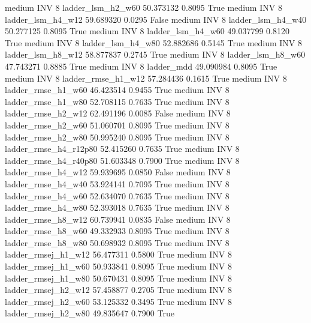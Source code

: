     medium      INV                 8      ladder_lsm_h2_w60  50.373132      0.8095    True
    medium      INV                 8      ladder_lsm_h4_w12  59.689320      0.0295   False
    medium      INV                 8      ladder_lsm_h4_w40  50.277125      0.8095    True
    medium      INV                 8      ladder_lsm_h4_w60  49.037799      0.8120    True
    medium      INV                 8      ladder_lsm_h4_w80  52.882686      0.5145    True
    medium      INV                 8      ladder_lsm_h8_w12  58.877837      0.2745    True
    medium      INV                 8      ladder_lsm_h8_w60  47.743271      0.8885    True
    medium      INV                 8             ladder_mdd  49.090984      0.8095    True
    medium      INV                 8     ladder_rmse_h1_w12  57.284436      0.1615    True
    medium      INV                 8     ladder_rmse_h1_w60  46.423514      0.9455    True
    medium      INV                 8     ladder_rmse_h1_w80  52.708115      0.7635    True
    medium      INV                 8     ladder_rmse_h2_w12  62.491196      0.0085   False
    medium      INV                 8     ladder_rmse_h2_w60  51.060701      0.8095    True
    medium      INV                 8     ladder_rmse_h2_w80  50.995240      0.8095    True
    medium      INV                 8  ladder_rmse_h4_r12p80  52.415260      0.7635    True
    medium      INV                 8  ladder_rmse_h4_r40p80  51.603348      0.7900    True
    medium      INV                 8     ladder_rmse_h4_w12  59.939695      0.0850   False
    medium      INV                 8     ladder_rmse_h4_w40  53.924141      0.7095    True
    medium      INV                 8     ladder_rmse_h4_w60  52.634070      0.7635    True
    medium      INV                 8     ladder_rmse_h4_w80  52.393018      0.7635    True
    medium      INV                 8     ladder_rmse_h8_w12  60.739941      0.0835   False
    medium      INV                 8     ladder_rmse_h8_w60  49.332933      0.8095    True
    medium      INV                 8     ladder_rmse_h8_w80  50.698932      0.8095    True
    medium      INV                 8    ladder_rmsej_h1_w12  56.477311      0.5800    True
    medium      INV                 8    ladder_rmsej_h1_w60  50.933841      0.8095    True
    medium      INV                 8    ladder_rmsej_h1_w80  50.670431      0.8095    True
    medium      INV                 8    ladder_rmsej_h2_w12  57.458877      0.2705    True
    medium      INV                 8    ladder_rmsej_h2_w60  53.125332      0.3495    True
    medium      INV                 8    ladder_rmsej_h2_w80  49.835647      0.7900    True
